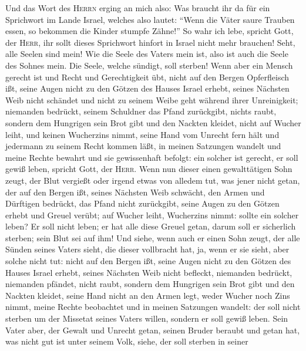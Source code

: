  Und das Wort des \textsc{Herrn} erging an mich also:
 Was braucht ihr da für ein Sprichwort im Lande Israel,
welches also lautet: ``Wenn die Väter saure Trauben essen, so bekommen
die Kinder stumpfe Zähne!''  So wahr ich lebe, spricht
Gott, der \textsc{Herr}, ihr sollt dieses Sprichwort hinfort in Israel
nicht mehr brauchen!  Seht, alle Seelen sind mein! Wie die
Seele des Vaters mein ist, also ist auch die Seele des Sohnes mein. Die
Seele, welche sündigt, soll sterben!  Wenn aber ein Mensch
gerecht ist und Recht und Gerechtigkeit übt,  nicht auf
den Bergen Opferfleisch ißt, seine Augen nicht zu den Götzen des Hauses
Israel erhebt, seines Nächsten Weib nicht schändet und nicht zu seinem
Weibe geht während ihrer Unreinigkeit;  niemanden
bedrückt, seinem Schuldner das Pfand zurückgibt, nichts raubt, sondern
dem Hungrigen sein Brot gibt und den Nackten kleidet, 
nicht auf Wucher leiht, und keinen Wucherzins nimmt, seine Hand vom
Unrecht fern hält und jedermann zu seinem Recht kommen läßt,
 in meinen Satzungen wandelt und meine Rechte bewahrt und
sie gewissenhaft befolgt: ein solcher ist gerecht, er soll gewiß leben,
spricht Gott, der \textsc{Herr}.  Wenn nun dieser einen
gewalttätigen Sohn zeugt, der Blut vergießt oder irgend etwas von
alledem tut,  was jener nicht getan, der auf den Bergen
ißt, seines Nächsten Weib schwächt,  den Armen und
Dürftigen bedrückt, das Pfand nicht zurückgibt, seine Augen zu den
Götzen erhebt und Greuel verübt;  auf Wucher leiht,
Wucherzins nimmt: sollte ein solcher leben? Er soll nicht leben; er hat
alle diese Greuel getan, darum soll er sicherlich sterben; sein Blut sei
auf ihm!  Und siehe, wenn auch er einen Sohn zeugt, der
alle Sünden seines Vaters sieht, die dieser vollbracht hat, ja, wenn er
sie sieht, aber solche nicht tut:  nicht auf den Bergen
ißt, seine Augen nicht zu den Götzen des Hauses Israel erhebt, seines
Nächsten Weib nicht befleckt,  niemanden bedrückt,
niemanden pfändet, nicht raubt, sondern dem Hungrigen sein Brot gibt und
den Nackten kleidet,  seine Hand nicht an den Armen legt,
weder Wucher noch Zins nimmt, meine Rechte beobachtet und in meinen
Satzungen wandelt: der soll nicht sterben um der Missetat seines Vaters
willen, sondern er soll gewiß leben.  Sein Vater aber,
der Gewalt und Unrecht getan, seinen Bruder beraubt und getan hat, was
nicht gut ist unter seinem Volk, siehe, der soll sterben in seiner
